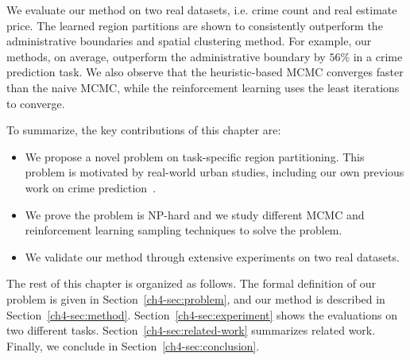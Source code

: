 We evaluate our method on two real datasets, i.e. crime count and real estimate price. The learned region partitions are shown to consistently outperform the administrative boundaries and spatial clustering method. For example, our methods, on average, outperform the administrative boundary by $56\%$ in a crime prediction task. We also observe that the heuristic-based MCMC converges faster than the naive MCMC, while the reinforcement learning uses the least iterations to converge.

To summarize, the key contributions of this chapter are:
\begin{itemize}[leftmargin=*]
\item We propose a novel problem on task-specific region partitioning. This problem is motivated by real-world urban studies, including our own previous work on crime prediction~\cite{wang2016crime}.
\item We prove the problem is NP-hard and we study different MCMC and reinforcement learning sampling techniques to solve the problem. 
\item We validate our method through extensive experiments on two real datasets.
\end{itemize}


The rest of this chapter is organized as follows. The formal definition of our problem is given in Section~\ref{ch4-sec:problem}, and our method is described in Section~\ref{ch4-sec:method}. Section~\ref{ch4-sec:experiment} shows the evaluations on two different tasks. Section~\ref{ch4-sec:related-work} summarizes related work.  Finally, we conclude in Section~\ref{ch4-sec:conclusion}.

